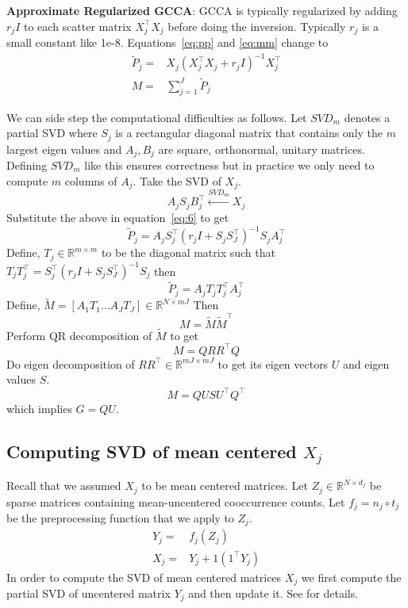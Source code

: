 \documentclass[11pt]{article}
\begin{document}
\textbf{Approximate Regularized GCCA}: GCCA is typically regularized by adding $r_jI$ to each
scatter matrix $X_j^\top X_j$ before doing the inversion. Typically
$r_j$ is a small constant like 1e-8. Equations~\ref{eq:pp}
and \ref{eq:mm} change to
\begin{align}
  \widetilde{P}_{j} =& X_j(X_j^\top X_j+r_jI)^{-1}X_j^\top \label{eq:6}\\
  M =& \sum_{j=1}^J \widetilde{P}_{j} \label{eq:mmm}
\end{align}

We can side step the computational difficulties as follows.
Let $SVD_m$ denotes a partial SVD where $S_j$ is a rectangular diagonal
matrix that contains only the $m$ largest eigen values and $A_j, B_j$
are square, orthonormal, unitary matrices. Defining $SVD_m$ like this
ensures correctness but in practice we only need to compute $m$
columns of $A_j$. Take the SVD of $X_j$.
$$A_{j} S_{j} B^\top_{j} \xleftarrow{SVD_{m}} X_j$$
 Substitute the above in equation~\ref{eq:6} to get 
$$\widetilde{P}_j = A_j S_j^\top(r_j I + S_j S_J^\top)^{-1}S_j A_j^\top$$ 
Define, $T_j \in \mathbb{R}^{m \times m}$ to be the diagonal matrix such that
$T_jT_j^\top = S_j^\top(r_j I + S_j S_J^\top)^{-1}S_j $ then
$$\widetilde{P}_j = A_j T_j T_j^\top A_j^\top$$
Define, $\tilde{M} = \left[ A_1T_1 \ldots A_JT_J \right] \in \mathbb{R}^{N
  \times mJ}$
Then 
$$M = \tilde{M} \tilde{M}^\top$$
Perform QR decomposition of $\tilde{M}$ to get
$$M = Q R R^\top Q$$
Do eigen decomposition of $R R^\top \in \mathbb{R}^{mJ \times mJ}$
to get its eigen vectors $U$ and eigen values $S$.
$$M = Q U S U^\top Q^\top$$
 which implies $G = QU$. 

\subsection{Computing SVD of mean centered $X_j$}
\label{ssec:svdmc}
Recall that we assumed $X_j$ to be mean centered matrices. Let $Z_j
\in \mathbb{R}^{N \times d_j}$ be sparse matrices containing
mean-uncentered cooccurrence counts. Let $f_j = n_j \circ t_j $ be the preprocessing
function that we apply to $Z_j$. 
\begin{align}
  Y_j =& f_j (Z_j) \\
  X_j =& Y_j + 1 (1^\top Y_j)
\end{align}
In order to compute the SVD of mean centered matrices $X_j$ we first
compute the partial SVD of uncentered 
matrix $Y_j$ and then update it. See \cite{brand2006fast} for details.
\end{document}
